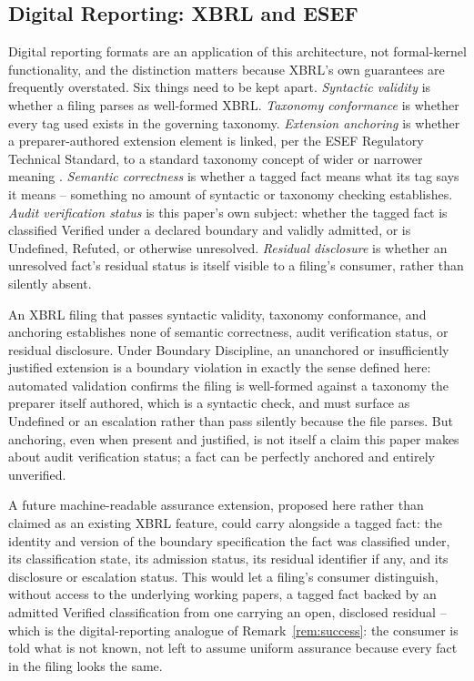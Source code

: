 \documentclass[11pt,a4paper]{article}
\theoremstyle{definition}
\theoremstyle{remark}
\begin{document}
\subsection{Digital Reporting: XBRL and ESEF}
\label{sec:xbrl}

Digital reporting formats are an application of this architecture, not formal-kernel functionality, and the distinction matters because XBRL's own guarantees are frequently overstated. Six things need to be kept apart. \emph{Syntactic validity} is whether a filing parses as well-formed XBRL. \emph{Taxonomy conformance} is whether every tag used exists in the governing taxonomy. \emph{Extension anchoring} is whether a preparer-authored extension element is linked, per the ESEF Regulatory Technical Standard, to a standard taxonomy concept of wider or narrower meaning \citep{esma2019esef}. \emph{Semantic correctness} is whether a tagged fact means what its tag says it means -- something no amount of syntactic or taxonomy checking establishes. \emph{Audit verification status} is this paper's own subject: whether the tagged fact is classified \textsf{Verified} under a declared boundary and validly admitted, or is \textsf{Undefined}, \textsf{Refuted}, or otherwise unresolved. \emph{Residual disclosure} is whether an unresolved fact's residual status is itself visible to a filing's consumer, rather than silently absent.

An XBRL filing that passes syntactic validity, taxonomy conformance, and anchoring establishes none of semantic correctness, audit verification status, or residual disclosure. Under Boundary Discipline, an unanchored or insufficiently justified extension is a boundary violation in exactly the sense defined here: automated validation confirms the filing is well-formed against a taxonomy the preparer itself authored, which is a syntactic check, and must surface as \textsf{Undefined} or an escalation rather than pass silently because the file parses. But anchoring, even when present and justified, is not itself a claim this paper makes about audit verification status; a fact can be perfectly anchored and entirely unverified.

A future machine-readable assurance extension, proposed here rather than claimed as an existing XBRL feature, could carry alongside a tagged fact: the identity and version of the boundary specification the fact was classified under, its classification state, its admission status, its residual identifier if any, and its disclosure or escalation status. This would let a filing's consumer distinguish, without access to the underlying working papers, a tagged fact backed by an admitted \textsf{Verified} classification from one carrying an open, disclosed residual -- which is the digital-reporting analogue of Remark~\ref{rem:success}: the consumer is told what is not known, not left to assume uniform assurance because every fact in the filing looks the same.
\end{document}

